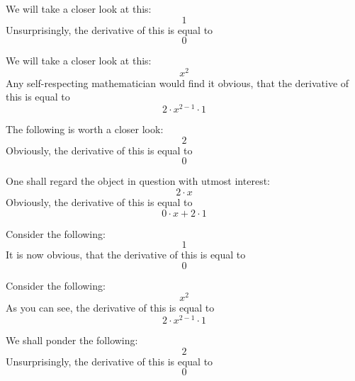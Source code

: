 \documentclass{article}
\begin{document}
We will take a closer look at this:
\begin{equation}
1 
\end{equation}
Unsurprisingly, the derivative of this is equal to
\begin{equation}
0 
\end{equation}

We will take a closer look at this:
\begin{equation}
x ^{2 } 
\end{equation}
Any self-respecting mathematician would find it obvious, that the derivative of this is equal to
\begin{equation}
2 \cdot x ^{2 - 1 } \cdot 1 
\end{equation}

The following is worth a closer look:
\begin{equation}
2 
\end{equation}
Obviously, the derivative of this is equal to
\begin{equation}
0 
\end{equation}

One shall regard the object in question with utmost interest:
\begin{equation}
2 \cdot x 
\end{equation}
Obviously, the derivative of this is equal to
\begin{equation}
0 \cdot x + 2 \cdot 1 
\end{equation}

Consider the following:
\begin{equation}
1 
\end{equation}
It is now obvious, that the derivative of this is equal to
\begin{equation}
0 
\end{equation}

Consider the following:
\begin{equation}
x ^{2 } 
\end{equation}
As you can see, the derivative of this is equal to
\begin{equation}
2 \cdot x ^{2 - 1 } \cdot 1 
\end{equation}

We shall ponder the following:
\begin{equation}
2 
\end{equation}
Unsurprisingly, the derivative of this is equal to
\begin{equation}
0 
\end{equation}
\end{document}
